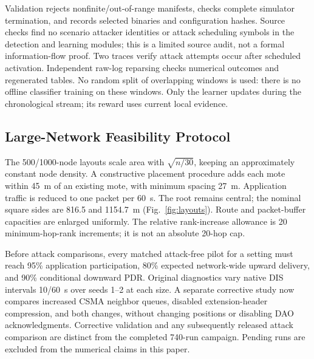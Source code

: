 Validation rejects nonfinite/out-of-range manifests, checks complete simulator termination, and records selected binaries and configuration hashes. Source checks find no scenario attacker identities or attack scheduling symbols in the detection and learning modules; this is a limited source audit, not a formal information-flow proof. Two traces verify attack attempts occur after scheduled activation. Independent raw-log reparsing checks numerical outcomes and regenerated tables. No random split of overlapping windows is used: there is no offline classifier training on these windows. Only the learner updates during the chronological stream; its reward uses current local evidence.

\subsection{Large-Network Feasibility Protocol}
The 500/1000-node layouts scale area with $\sqrt{n/30}$, keeping an approximately constant node density. A constructive placement procedure adds each mote within 45~m of an existing mote, with minimum spacing 27~m. Application traffic is reduced to one packet per 60~s. The root remains central; the nominal square sides are 816.5 and 1154.7~m (Fig.~\ref{fig:layouts}). Route and packet-buffer capacities are enlarged uniformly. The relative rank-increase allowance is 20 minimum-hop-rank increments; it is not an absolute 20-hop cap.

Before attack comparisons, every matched attack-free pilot for a setting must reach 95\% application participation, 80\% expected network-wide upward delivery, and 90\% conditional downward PDR. Original diagnostics vary native DIS intervals 10/60~s over seeds 1--2 at each size. A separate corrective study now compares increased CSMA neighbor queues, disabled extension-header compression, and both changes, without changing positions or disabling DAO acknowledgments. Corrective validation and any subsequently released attack comparison are distinct from the completed 740-run campaign. Pending runs are excluded from the numerical claims in this paper.
